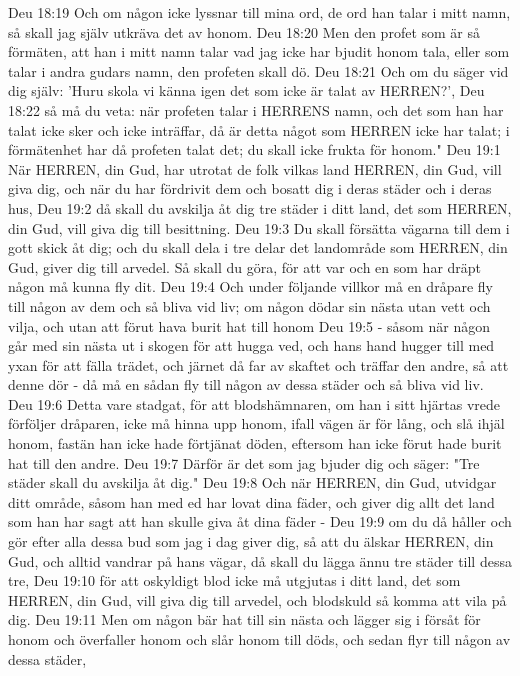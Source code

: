 Deu 18:19  Och om någon icke lyssnar till mina ord, de ord han talar i mitt namn, så skall jag själv utkräva det av honom.
Deu 18:20  Men den profet som är så förmäten, att han i mitt namn talar vad jag icke har bjudit honom tala, eller som talar i andra gudars namn, den profeten skall dö.
Deu 18:21  Och om du säger vid dig själv: 'Huru skola vi känna igen det som icke är talat av HERREN?',
Deu 18:22  så må du veta: när profeten talar i HERRENS namn, och det som han har talat icke sker och icke inträffar, då är detta något som HERREN icke har talat; i förmätenhet har då profeten talat det; du skall icke frukta för honom."
Deu 19:1  När HERREN, din Gud, har utrotat de folk vilkas land HERREN, din Gud, vill giva dig, och när du har fördrivit dem och bosatt dig i deras städer och i deras hus,
Deu 19:2  då skall du avskilja åt dig tre städer i ditt land, det som HERREN, din Gud, vill giva dig till besittning.
Deu 19:3  Du skall försätta vägarna till dem i gott skick åt dig; och du skall dela i tre delar det landområde som HERREN, din Gud, giver dig till arvedel. Så skall du göra, för att var och en som har dräpt någon må kunna fly dit.
Deu 19:4  Och under följande villkor må en dråpare fly till någon av dem och så bliva vid liv; om någon dödar sin nästa utan vett och vilja, och utan att förut hava burit hat till honom
Deu 19:5  - såsom när någon går med sin nästa ut i skogen för att hugga ved, och hans hand hugger till med yxan för att fälla trädet, och järnet då far av skaftet och träffar den andre, så att denne dör - då må en sådan fly till någon av dessa städer och så bliva vid liv.
Deu 19:6  Detta vare stadgat, för att blodshämnaren, om han i sitt hjärtas vrede förföljer dråparen, icke må hinna upp honom, ifall vägen är för lång, och slå ihjäl honom, fastän han icke hade förtjänat döden, eftersom han icke förut hade burit hat till den andre.
Deu 19:7  Därför är det som jag bjuder dig och säger: "Tre städer skall du avskilja åt dig."
Deu 19:8  Och när HERREN, din Gud, utvidgar ditt område, såsom han med ed har lovat dina fäder, och giver dig allt det land som han har sagt att han skulle giva åt dina fäder -
Deu 19:9  om du då håller och gör efter alla dessa bud som jag i dag giver dig, så att du älskar HERREN, din Gud, och alltid vandrar på hans vägar, då skall du lägga ännu tre städer till dessa tre,
Deu 19:10  för att oskyldigt blod icke må utgjutas i ditt land, det som HERREN, din Gud, vill giva dig till arvedel, och blodskuld så komma att vila på dig.
Deu 19:11  Men om någon bär hat till sin nästa och lägger sig i försåt för honom och överfaller honom och slår honom till döds, och sedan flyr till någon av dessa städer,
